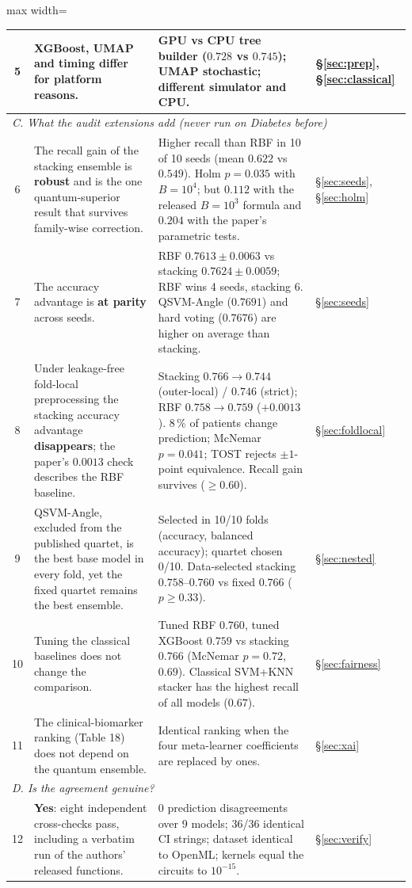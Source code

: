\documentclass[11pt,a4paper]{article}
\newcommand{\OK}[1]{\textcolor{ok}{\textbf{#1}}}
\newcommand{\WARN}[1]{\textcolor{warn}{\textbf{#1}}}
\newcommand{\BAD}[1]{\textcolor{bad}{\textbf{#1}}}
\begin{document}
\begin{table}[H]
\begin{adjustbox}{max width=\textwidth}
\begin{tabular}{c p{5.6cm} p{6.6cm} l}
5 & XGBoost, UMAP and timing differ for \WARN{platform} reasons. & GPU vs CPU tree builder ($0.728$ vs $0.745$); UMAP stochastic; different simulator and CPU. & \S\ref{sec:prep}, \S\ref{sec:classical} \\
\midrule
\multicolumn{4}{l}{\textit{C. What the audit extensions add (never run on Diabetes before)}} \\
6 & The recall gain of the stacking ensemble is \OK{robust} and is the one quantum-superior result that survives family-wise correction. & Higher recall than RBF in 10 of 10 seeds (mean $0.622$ vs $0.549$). Holm $p=0.035$ with $B=10^4$; but $0.112$ with the released $B=10^3$ formula and $0.204$ with the paper's parametric tests. & \S\ref{sec:seeds}, \S\ref{sec:holm} \\
7 & The accuracy advantage is \WARN{at parity} across seeds. & RBF $0.7613\pm0.0063$ vs stacking $0.7624\pm0.0059$; RBF wins 4 seeds, stacking 6. QSVM-Angle ($0.7691$) and hard voting ($0.7676$) are higher on average than stacking. & \S\ref{sec:seeds} \\
8 & Under leakage-free fold-local preprocessing the stacking accuracy advantage \BAD{disappears}; the paper's $0.0013$ check describes the RBF baseline. & Stacking $0.766\to0.744$ (outer-local) / $0.746$ (strict); RBF $0.758\to0.759$ ($+0.0013$). 8\,\% of patients change prediction; McNemar $p=0.041$; TOST rejects $\pm1$-point equivalence. Recall gain survives ($\ge0.60$). & \S\ref{sec:foldlocal} \\
9 & QSVM-Angle, excluded from the published quartet, is the best base model in every fold, yet the fixed quartet remains the best ensemble. & Selected in 10/10 folds (accuracy, balanced accuracy); quartet chosen 0/10. Data-selected stacking $0.758$--$0.760$ vs fixed $0.766$ ($p\ge0.33$). & \S\ref{sec:nested} \\
10 & Tuning the classical baselines does not change the comparison. & Tuned RBF $0.760$, tuned XGBoost $0.759$ vs stacking $0.766$ (McNemar $p=0.72$, $0.69$). Classical SVM+KNN stacker has the highest recall of all models ($0.67$). & \S\ref{sec:fairness} \\
11 & The clinical-biomarker ranking (Table 18) does not depend on the quantum ensemble. & Identical ranking when the four meta-learner coefficients are replaced by ones. & \S\ref{sec:xai} \\
\midrule
\multicolumn{4}{l}{\textit{D. Is the agreement genuine?}} \\
12 & \OK{Yes}: eight independent cross-checks pass, including a verbatim run of the authors' released functions. & 0 prediction disagreements over 9 models; 36/36 identical CI strings; dataset identical to OpenML; kernels equal the circuits to $10^{-15}$. & \S\ref{sec:verify} \\
\bottomrule
\end{tabular}
\end{adjustbox}
\end{table}
\end{document}
